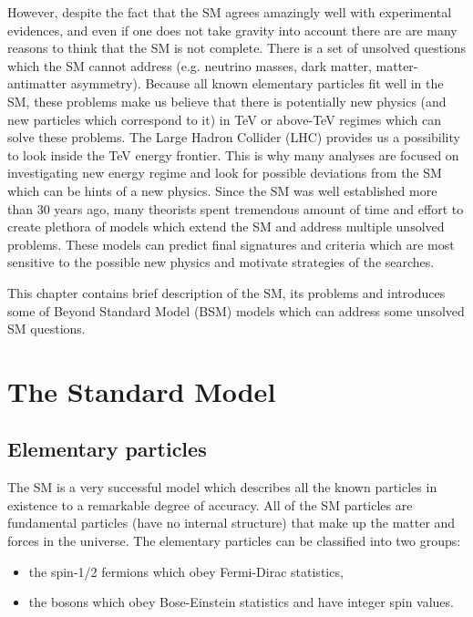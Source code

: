 However, despite the fact that the SM agrees amazingly well with experimental evidences, and even if one does not take gravity into account 
there are are many reasons to think that the SM is not complete.
There is a set of unsolved questions which the SM cannot address (e.g. neutrino masses, dark matter, matter-antimatter asymmetry).
Because all known elementary particles fit well in the SM, these problems make us believe that there is
potentially new physics (and new particles which correspond to it) in TeV or above-TeV regimes which can solve these problems.
The Large Hadron Collider (LHC) provides us a possibility to look inside the TeV energy frontier.
This is why many analyses are focused on investigating new energy regime and look for possible deviations from the SM which can be hints of a new physics.
Since the SM was well established more than 30 years ago, many theorists spent tremendous amount of time and effort to create
plethora of models which extend the SM and address multiple unsolved problems. These models can predict final signatures and criteria which are most sensitive to 
the possible new physics and motivate strategies of the searches.

This chapter contains brief description of the SM, its problems and introduces some of Beyond Standard Model (BSM) models which can address some unsolved SM questions.

\section{The Standard Model}

\subsection{Elementary particles}


The SM is a very successful model which describes all the known particles in existence to a remarkable degree of accuracy.
All of the SM particles are fundamental particles (have no internal structure) that make up the matter and forces in the universe.
The elementary particles can be classified into two groups: 
\begin{itemize}
 \item the spin-1/2 fermions which obey Fermi-Dirac statistics,
 \item the bosons which obey Bose-Einstein statistics and have integer spin values.
\end{itemize}

